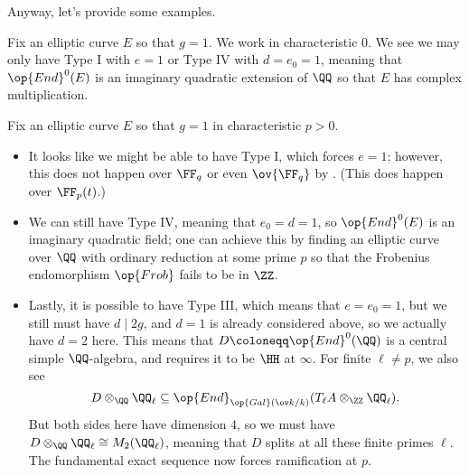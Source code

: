 \documentclass[../notes.tex]{subfiles}
\begin{document}
Anyway, let's provide some examples.
\begin{example}
	Fix an elliptic curve $E$ so that $g=1$. We work in characteristic $0$. We see we may only have Type I with $e=1$ or Type IV with $d=e_0=1$, meaning that $\op{End}^0(E)$ is an imaginary quadratic extension of $\QQ$ so that $E$ has complex multiplication.
\end{example}
\begin{example}
	Fix an elliptic curve $E$ so that $g=1$ in characteristic $p>0$.
	\begin{itemize}
		\item It looks like we might be able to have Type I, which forces $e=1$; however, this does not happen over $\FF_q$ or even $\ov{\FF_q}$ by . (This does happen over $\FF_p(t)$.)
		
		\item We can still have Type IV, meaning that $e_0=d=1$, so $\op{End}^0(E)$ is an imaginary quadratic field; one can achieve this by finding an elliptic curve over $\QQ$ with ordinary reduction at some prime $p$ so that the Frobenius endomorphism $\op{Frob}$ fails to be in $\ZZ$.
		
		\item Lastly, it is possible to have Type III, which means that $e=e_0=1$, but we still must have $d\mid2g$, and $d=1$ is already considered above, so we actually have $d=2$ here. This means that $D\coloneqq\op{End}^0(\QQ)$ is a central simple $\QQ$-algebra, and  requires it to be $\HH$ at $\infty$. For finite $\ell\ne p$, we also see
		\[D\otimes_\QQ\QQ_\ell\subseteq\op{End}_{\op{Gal}(\ov k/k)}(T_\ell A\otimes_\ZZ\QQ_\ell).\]
		But both sides here have dimension $4$, so we must have $D\otimes_\QQ\QQ_\ell\cong M_2(\QQ_\ell)$, meaning that $D$ splits at all these finite primes $\ell$. The fundamental exact sequence now forces ramification at $p$.
	\end{itemize}
\end{example}
\end{document}
